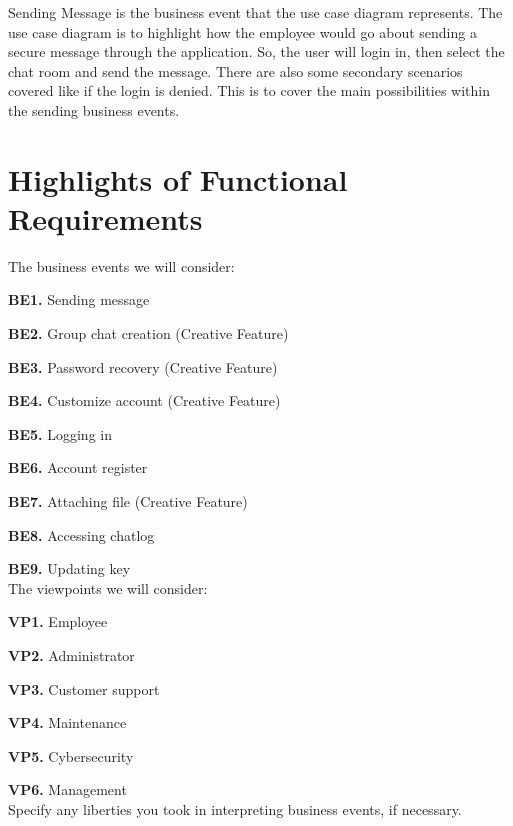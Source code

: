 \documentclass[]{article}
\begin{document}
\hspace{5mm}Sending Message is the business event that the use case diagram represents. The use case diagram is to highlight how the employee would go about sending a secure message through the application. So, the user will login in, then select the chat room and send the message. There are also some secondary scenarios covered like if the login is denied. This is to cover the main possibilities within the sending business events.

\section{Highlights of Functional Requirements}
\label{sec:functional_requirements}
The business events we will consider:

\textbf{BE1.} Sending message

\textbf{BE2.} Group chat creation (Creative Feature)

\textbf{BE3.} Password recovery (Creative Feature)

\textbf{BE4.} Customize account (Creative Feature)

\textbf{BE5.} Logging in

\textbf{BE6.} Account register

\textbf{BE7.} Attaching file (Creative Feature)

\textbf{BE8.} Accessing chatlog

\textbf{BE9.} Updating key\\

\noindent The viewpoints we will consider:

\textbf{VP1.} Employee

\textbf{VP2.} Administrator

\textbf{VP3.} Customer support

\textbf{VP4.} Maintenance

\textbf{VP5.} Cybersecurity

\textbf{VP6.} Management\\

 Specify any liberties you took in interpreting business events, if necessary.\\
\end{document}
